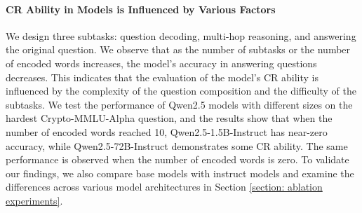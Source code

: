 \paragraph{CR Ability in Models is Influenced by Various Factors}
We design three subtasks: question decoding, multi-hop reasoning, and answering the original question. 
We observe that as the number of subtasks or the number of encoded words increases, the model's accuracy in answering questions decreases. This indicates that the evaluation of the model's CR ability is influenced by the complexity of the question composition and the difficulty of the subtasks. 
We test the performance of Qwen2.5 models with different sizes on the hardest Crypto-MMLU-Alpha question, and the results show that when the number of encoded words reached 10, Qwen2.5-1.5B-Instruct has near-zero accuracy, while Qwen2.5-72B-Instruct demonstrates some CR ability. The same performance is observed when the number of encoded words is zero. 
To validate our findings, we also compare base models with instruct models and examine the differences across various model architectures in Section \ref{section: ablation experiments}.


